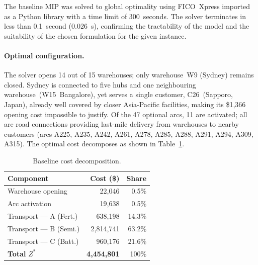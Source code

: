 
The baseline MIP was solved to global optimality using FICO~Xpress imported as a
Python library with a time limit of 300~seconds.
The solver terminates in less than 0.1~second ($0.026$~s), confirming the
tractability of the model and the suitability of the chosen formulation for the
given instance.

\paragraph{Optimal configuration.}
The solver opens 14 out of 15 warehouses; only warehouse~W9 (Sydney) remains
closed.
Sydney is connected to five hubs and one neighbouring warehouse~(W15~Bangalore),
yet serves a single customer, C26~(Sapporo, Japan), already well covered by
closer Asia-Pacific facilities, making its \$1{,}366 opening cost impossible to
justify.
Of the 47 optional arcs, 11 are activated; all are road connections providing
last-mile delivery from warehouses to nearby customers (arcs A225, A235, A242,
A261, A278, A285, A288, A291, A294, A309, A315).
The optimal cost decomposes as shown in Table~\ref{tab:phase1costs}.

\begin{table}[H]
\centering
\caption{Baseline cost decomposition.}
\label{tab:phase1costs}
{\footnotesize\setlength{\tabcolsep}{4pt}
\begin{tabular}{@{}lrr@{}}
\toprule
\textbf{Component} & \textbf{Cost (\$)} & \textbf{Share} \\
\midrule
Warehouse opening     &      22{,}046 &  0.5\% \\
Arc activation        &      19{,}638 &  0.5\% \\
Transport --- A (Fert.) &    638{,}198 & 14.3\% \\
Transport --- B (Semi.) &  2{,}814{,}741 & 63.2\% \\
Transport --- C (Batt.) &    960{,}176 & 21.6\% \\
\midrule
\textbf{Total} $Z^*$  & \textbf{4{,}454{,}801} & 100\% \\
\bottomrule
\end{tabular}}
\end{table}

